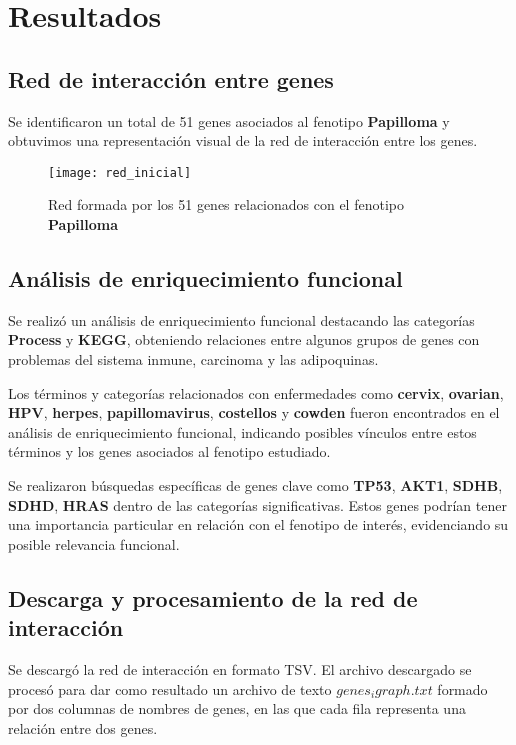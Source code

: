 
\section{Resultados}

\subsection{Red de interacción entre genes}

Se identificaron un total de 51 genes asociados al fenotipo \textbf{Papilloma} y obtuvimos una representación visual de la red de interacción entre los genes.
\begin{figure}
	\centering
	\texttt{[image: red\_inicial]}
	\caption{Red formada por los 51 genes relacionados con el fenotipo \textbf{Papilloma}}
	\label{fig:grado_centralidad}
\end{figure}

\subsection{Análisis de enriquecimiento funcional}

Se realizó un análisis de enriquecimiento funcional destacando las categorías \textbf{Process} y \textbf{KEGG}, obteniendo relaciones entre algunos grupos de genes con problemas del sistema inmune, carcinoma y las adipoquinas.

Los términos y categorías relacionados con enfermedades como \textbf{cervix}, \textbf{ovarian}, \textbf{HPV}, \textbf{herpes}, \textbf{papillomavirus}, \textbf{costellos} y \textbf{cowden} fueron encontrados en el análisis de enriquecimiento funcional, indicando posibles vínculos entre estos términos y los genes asociados al fenotipo estudiado.

Se realizaron búsquedas específicas de genes clave como \textbf{TP53}, \textbf{AKT1}, \textbf{SDHB}, \textbf{SDHD}, \textbf{HRAS} dentro de las categorías significativas. Estos genes podrían tener una importancia particular en relación con el fenotipo de interés, evidenciando su posible relevancia funcional.

\subsection{Descarga y procesamiento de la red de interacción}

Se descargó la red de interacción en formato TSV. El archivo descargado se procesó para dar como resultado un archivo de texto \textbf{$genes_igraph.txt$} formado por dos columnas de nombres de genes, en las que cada fila representa una relación entre dos genes.



